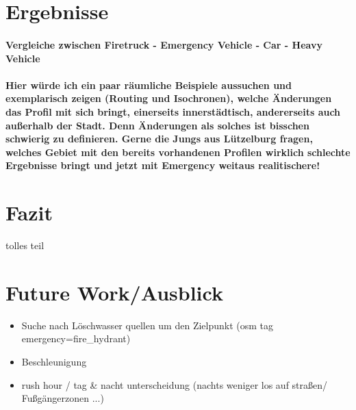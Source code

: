 \documentclass[10pt,a4paper]{article}
\begin{document}
\section{Ergebnisse}
\paragraph{
Vergleiche zwischen Firetruck - Emergency Vehicle - Car - Heavy Vehicle
}
\paragraph{
\color{red}
Hier würde ich ein paar räumliche Beispiele aussuchen und exemplarisch zeigen (Routing und Isochronen), welche Änderungen das Profil mit sich bringt, einerseits innerstädtisch, andererseits auch außerhalb der Stadt. Denn Änderungen als solches ist bisschen schwierig zu definieren. Gerne die Jungs aus Lützelburg fragen, welches Gebiet mit den bereits vorhandenen Profilen wirklich schlechte Ergebnisse bringt und jetzt mit Emergency weitaus realitischere!
}

\section{Fazit}

tolles teil

\section{Future Work/Ausblick}
\begin{itemize}
\item Suche nach Löschwasser quellen um den Zielpunkt (osm tag emergency=fire_hydrant)
\item Beschleunigung
\item rush hour / tag & nacht unterscheidung (nachts weniger los auf straßen/ Fußgängerzonen ...)
\end{itemize}
\end{document}
